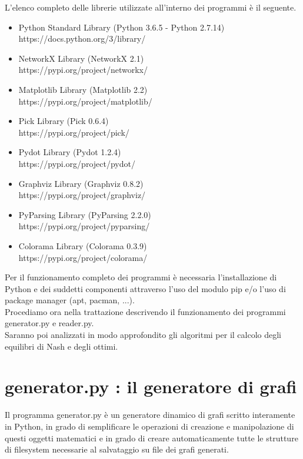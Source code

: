 L'elenco completo delle librerie utilizzate all'interno dei programmi è il seguente.

\begin{itemize}
	\item Python Standard Library (Python 3.6.5 - Python 2.7.14)\\
	https://docs.python.org/3/library/
	\item NetworkX Library (NetworkX 2.1)\\ 	
	https://pypi.org/project/networkx/	
	\item Matplotlib Library (Matplotlib 2.2)\\
	https://pypi.org/project/matplotlib/
	\item Pick Library (Pick 0.6.4)\\
	https://pypi.org/project/pick/
	\item Pydot Library (Pydot 1.2.4)\\
	https://pypi.org/project/pydot/
	\item Graphviz Library (Graphviz 0.8.2)\\
	https://pypi.org/project/graphviz/
	\item PyParsing Library (PyParsing 2.2.0)\\
	https://pypi.org/project/pyparsing/
	\item Colorama Library (Colorama 0.3.9)\\
	https://pypi.org/project/colorama/
\end{itemize}

Per il funzionamento completo dei programmi è necessaria l'installazione di Python e dei suddetti componenti attraverso l'uso del modulo pip e/o l'uso di package manager (apt, pacman, ...).\\

Procediamo ora nella trattazione descrivendo il funzionamento dei programmi generator.py e reader.py.\\
Saranno poi analizzati in modo approfondito gli algoritmi per il calcolo degli equilibri di Nash e degli ottimi.\\

\section{generator.py : il generatore di grafi}
\justify
Il programma generator.py è un generatore dinamico di grafi scritto interamente in Python, in grado di semplificare le operazioni di creazione e manipolazione di questi oggetti matematici e in grado di creare automaticamente tutte le strutture di filesystem necessarie al salvataggio su file dei grafi generati.\\

